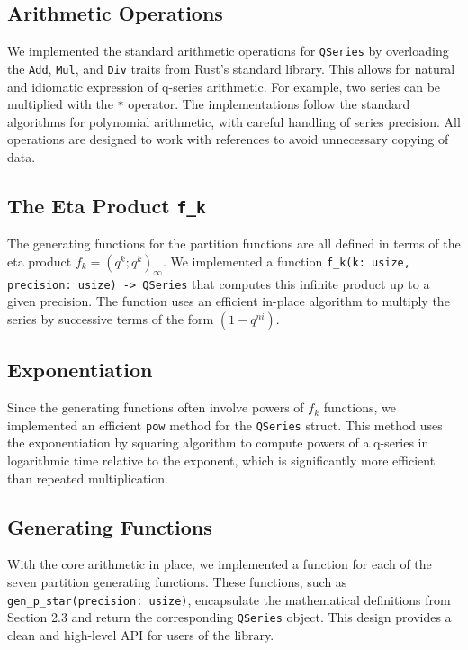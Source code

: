 \documentclass{article}
\begin{document}
\subsection{Arithmetic Operations}

We implemented the standard arithmetic operations for \texttt{QSeries} by overloading the \texttt{Add}, \texttt{Mul}, and \texttt{Div} traits from Rust's standard library. This allows for natural and idiomatic expression of q-series arithmetic. For example, two series can be multiplied with the \texttt{*} operator. The implementations follow the standard algorithms for polynomial arithmetic, with careful handling of series precision. All operations are designed to work with references to avoid unnecessary copying of data.

\subsection{The Eta Product \texttt{f\_k}}

The generating functions for the partition functions are all defined in terms of the eta product $f_k = (q^k; q^k)_\infty$. We implemented a function \texttt{f\_k(k: usize, precision: usize) -> QSeries} that computes this infinite product up to a given precision. The function uses an efficient in-place algorithm to multiply the series by successive terms of the form $(1 - q^{ni})$.

\subsection{Exponentiation}

Since the generating functions often involve powers of $f_k$ functions, we implemented an efficient \texttt{pow} method for the \texttt{QSeries} struct. This method uses the exponentiation by squaring algorithm to compute powers of a q-series in logarithmic time relative to the exponent, which is significantly more efficient than repeated multiplication.

\subsection{Generating Functions}

With the core arithmetic in place, we implemented a function for each of the seven partition generating functions. These functions, such as \texttt{gen\_p\_star(precision: usize)}, encapsulate the mathematical definitions from Section 2.3 and return the corresponding \texttt{QSeries} object. This design provides a clean and high-level API for users of the library.
\end{document}
